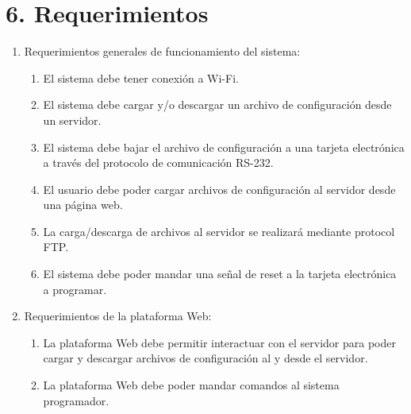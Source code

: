 \documentclass[
11pt, %
]{charter}
\begin{document}
\section{6. Requerimientos}
\label{sec:requerimientos}

\begin{enumerate}
	\item Requerimientos generales de funcionamiento del sistema:
		\begin{enumerate}
			\item El sistema debe tener conexión a Wi-Fi.
			\item El sistema debe cargar y/o descargar un archivo de configuración desde un servidor.
			\item El sistema debe bajar el archivo de configuración a una tarjeta electrónica a través del protocolo de comunicación RS-232.
			\item El usuario debe poder cargar archivos de configuración al servidor desde una página web.
			\item La carga/descarga de archivos al servidor se realizará mediante protocol FTP.
			\item El sistema debe poder mandar una señal de reset a la tarjeta electrónica a programar.
		\end{enumerate}
	\item Requerimientos de la plataforma Web:
		\begin{enumerate}
			\item La plataforma Web debe permitir interactuar con el servidor para poder cargar y descargar archivos de configuración al y desde el servidor.
			\item La plataforma Web debe poder mandar comandos al sistema programador.
			
			
		\end{enumerate}
		

\end{enumerate}
\end{document}
